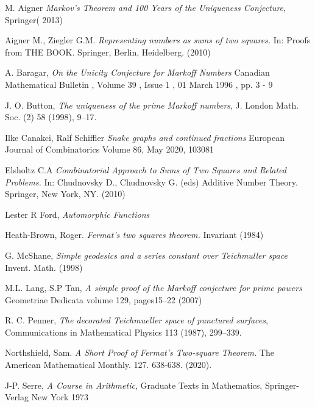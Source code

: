 \documentclass[12pt,a4paper]{amsart}
\begin{document}
%

%
%




M. Aigner
\textit{Markov's Theorem and 100 Years of the Uniqueness Conjecture}, Springer( 2013)

Aigner M., Ziegler G.M.  
\textit{Representing numbers as sums of two squares.} In: Proofs from THE BOOK. Springer, Berlin, Heidelberg. (2010)

A. Baragar,
\textit{On the Unicity Conjecture for Markoff Numbers}
Canadian Mathematical Bulletin , Volume 39 , Issue 1 , 01 March 1996 , pp. 3 - 9

J. O. Button, 
\textit{The uniqueness of the prime Markoff numbers},
 J. London Math. Soc.
(2) 58 (1998), 9–17.

Ilke Canakci, Ralf Schiffler
\textit{Snake graphs and continued fractions}
European Journal of Combinatorics
Volume 86, May 2020, 103081

Elsholtz C.A 
\textit{Combinatorial Approach to Sums of Two Squares and Related Problems.}
 In: Chudnovsky D., Chudnovsky G. (eds) Additive Number Theory. Springer, New York, NY.
 (2010) 


Lester R Ford,
\textit{Automorphic Functions}

Heath-Brown, Roger. 
\textit{ Fermat’s two squares theorem.} Invariant (1984) 

G. McShane,
\textit{Simple geodesics and a series constant over Teichmuller space}
Invent. Math. (1998)

M.L. Lang, S.P Tan,
\textit{A simple proof of the Markoff conjecture for prime powers}
Geometriae Dedicata volume 129, pages15–22 (2007)

R. C. Penner, 
\textit{The decorated Teichmueller space of punctured surfaces}, 
Communications in Mathematical Physics 113 (1987), 299–339.


Northshield, Sam. 
\textit{A Short Proof of Fermat’s Two-square Theorem.} The American Mathematical Monthly. 127. 638-638. (2020). 

J-P. Serre,
\textit{A Course in Arithmetic},
Graduate Texts in Mathematics,
Springer-Verlag New York
1973
\end{document}
